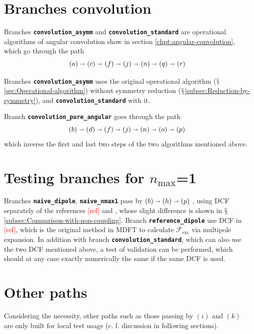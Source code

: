 \section{Branches \textquotedbl{}convolution\textquotedbl{}}

Branches\textbf{ }\texttt{\textbf{convolution\_asymm}} and \texttt{\textbf{convolution\_standard}}
are operational algorithms of angular convolution show in section
\ref{chpt:angular-convolution}, which go through the path 
\[
\left(a\right)\shortrightarrow\left(c\right)\shortrightarrow\left(f\right)\shortrightarrow\left(j\right)\shortrightarrow\left(n\right)\shortrightarrow\left(q\right)\shortrightarrow\left(r\right)
\]

Branches\textbf{ }\texttt{\textbf{convolution\_asymm}} uses the original
operational algorithm ($\mathsection$\ref{sec:Operational-algorithm})
without symmetry reduction ($\mathsection$\ref{subsec:Reduction-by-symmetry}),
and \texttt{\textbf{convolution\_standard}} with it. 

Branch \texttt{\textbf{convolution\_pure\_angular}} goes through the
path 
\[
\left(b\right)\shortrightarrow\left(d\right)\shortrightarrow\left(f\right)\shortrightarrow\left(j\right)\shortrightarrow\left(n\right)\shortrightarrow\left(o\right)\shortrightarrow\left(p\right)
\]
which inverse the first and last two steps of the two algorithms mentioned
above.

\section{Testing branches for $n_{\max}$=1}

Branches \texttt{\textbf{naive\_dipole}}, \texttt{\textbf{naive\_nmax1}}
pass by $\left(b\right)\shortrightarrow\left(h\right)\shortrightarrow\left(p\right)$
, using DCF separately of the references \textcolor{red}{{[}ref{]}}
and {\footnotesize{}\citep{puibasset_bridge_2012}}, whose slight
difference is shown in $\mathsection$\ref{subsec:Comparison-with-non-coupling}.
Branch \texttt{\textbf{reference\_dipole}} use DCF in \textcolor{red}{{[}ref{]}},
which is the original method in MDFT to calculate $\mathcal{F}_{\mathrm{exc}}$
via multipole expansion. In addition with branch \texttt{\textbf{convolution\_standard}},
which can also use the two DCF mentioned above, a test of validation
can be performed, which should at any case exactly numerically the
same if the same DCF is used.

\section{Other paths}

Considering the necessity, other paths such as those passing by $\left(i\right)$
and $\left(k\right)$ are only built for local test usage (c. f. discussion
in following sections).
